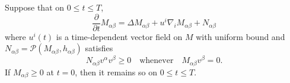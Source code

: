 \begin{lemma}
  \label{lem:cz-tensor-maximum-principle-on-complete-manifolds}
Suppose that on $0\le t\le T$,
$$
\frac{\partial}{\partial t}M_{\alpha\beta} =\Delta
M_{\alpha\beta}+u^i\nabla_i M_{\alpha\beta}+N_{\alpha\beta}
$$
where $u^i(t)$ is a time-dependent vector field on $M$ with
uniform bound and
$N_{\alpha\beta}={\mathcal{P}}(M_{\alpha\beta},h_{\alpha\beta})$
satisfies
$$
N_{\alpha\beta}v^\alpha v^\beta\ge 0 \quad \text{whenever} \quad
M_{\alpha\beta}v^\beta=0.
$$
If $M_{\alpha\beta}\ge 0$ at $t=0$, then it remains so on $0\le
t\le T$.
\end{lemma}

